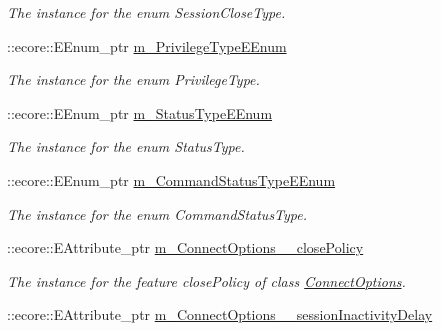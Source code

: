 \begin{DoxyCompactItemize}
\begin{DoxyCompactList}\small\item\em The instance for the enum SessionCloseType. \item\end{DoxyCompactList}\item 
\hypertarget{classUMS__Data_1_1UMS__DataPackage_a0e7710033cb4a83a89a0fabf67dac8bd}{
::ecore::EEnum\_\-ptr \hyperlink{classUMS__Data_1_1UMS__DataPackage_a0e7710033cb4a83a89a0fabf67dac8bd}{m\_\-PrivilegeTypeEEnum}}
\label{classUMS__Data_1_1UMS__DataPackage_a0e7710033cb4a83a89a0fabf67dac8bd}

\begin{DoxyCompactList}\small\item\em The instance for the enum PrivilegeType. \item\end{DoxyCompactList}\item 
\hypertarget{classUMS__Data_1_1UMS__DataPackage_a01b1d1193ada13b7230cccb6c42acf21}{
::ecore::EEnum\_\-ptr \hyperlink{classUMS__Data_1_1UMS__DataPackage_a01b1d1193ada13b7230cccb6c42acf21}{m\_\-StatusTypeEEnum}}
\label{classUMS__Data_1_1UMS__DataPackage_a01b1d1193ada13b7230cccb6c42acf21}

\begin{DoxyCompactList}\small\item\em The instance for the enum StatusType. \item\end{DoxyCompactList}\item 
\hypertarget{classUMS__Data_1_1UMS__DataPackage_a3600650046a72f225536029f5feb0af2}{
::ecore::EEnum\_\-ptr \hyperlink{classUMS__Data_1_1UMS__DataPackage_a3600650046a72f225536029f5feb0af2}{m\_\-CommandStatusTypeEEnum}}
\label{classUMS__Data_1_1UMS__DataPackage_a3600650046a72f225536029f5feb0af2}

\begin{DoxyCompactList}\small\item\em The instance for the enum CommandStatusType. \item\end{DoxyCompactList}\item 
\hypertarget{classUMS__Data_1_1UMS__DataPackage_a02a303b044715885d3497cf4530a9475}{
::ecore::EAttribute\_\-ptr \hyperlink{classUMS__Data_1_1UMS__DataPackage_a02a303b044715885d3497cf4530a9475}{m\_\-ConnectOptions\_\-\_\-closePolicy}}
\label{classUMS__Data_1_1UMS__DataPackage_a02a303b044715885d3497cf4530a9475}

\begin{DoxyCompactList}\small\item\em The instance for the feature closePolicy of class \hyperlink{classUMS__Data_1_1ConnectOptions}{ConnectOptions}. \item\end{DoxyCompactList}\item 
\hypertarget{classUMS__Data_1_1UMS__DataPackage_a9d225117caab495518e6e515c9f2cc97}{
::ecore::EAttribute\_\-ptr \hyperlink{classUMS__Data_1_1UMS__DataPackage_a9d225117caab495518e6e515c9f2cc97}{m\_\-ConnectOptions\_\-\_\-sessionInactivityDelay}}
\label{classUMS__Data_1_1UMS__DataPackage_a9d225117caab495518e6e515c9f2cc97}


\end{DoxyCompactItemize}

